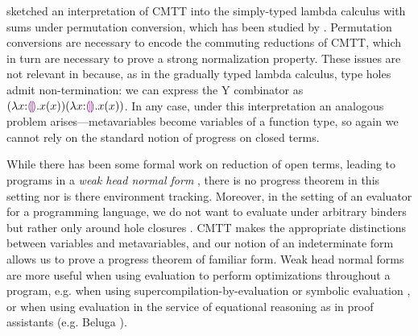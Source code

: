 \citet{Nanevski2008} sketched an interpretation of CMTT into the simply-typed lambda calculus with sums under permutation conversion, %
which has been studied by \citet{DBLP:journals/iandc/Groote02}. 
Permutation conversions are necessary to encode the commuting reductions of CMTT, which in turn are necessary to prove a strong normalization property. 
These issues are not relevant in \HazelnutLive because, as in the gradually typed lambda calculus, type holes admit non-termination: we can express the Y combinator as $(\lambda x{:}\textcolor{violet}{\llparenthesis}\textcolor{violet}{\rrparenthesis}.x(x)) (\lambda x{:}\textcolor{violet}{\llparenthesis}\textcolor{violet}{\rrparenthesis}.x(x))$.
In any case, under this interpretation an analogous problem arises---metavariables become variables of a function type, so again we cannot rely on the standard notion of progress on closed terms. 

While there has been some formal work on reduction of open terms, leading to programs in a \emph{weak head normal form} \cite{barendregt84:_lambda_calculus,DBLP:journals/corr/abs-1009-2789}, there is no progress theorem in this setting nor is there environment tracking. Moreover, in the setting of an evaluator for a programming language, we do not want to evaluate under arbitrary binders but rather only around hole closures \cite{DBLP:conf/birthday/BlancLM05}. CMTT makes the appropriate distinctions between variables and metavariables, and our notion of an indeterminate form allows us to prove a progress theorem of familiar form. Weak head normal forms are more useful when using evaluation to perform optimizations throughout a program, e.g. when using supercompilation-by-evaluation \cite{DBLP:conf/haskell/BolingbrokeJ10} or symbolic evaluation \cite{King:1976}, or when using evaluation in the service of equational reasoning as in proof assistants (e.g. Beluga \cite{DBLP:journals/corr/abs-1009-2789}).

